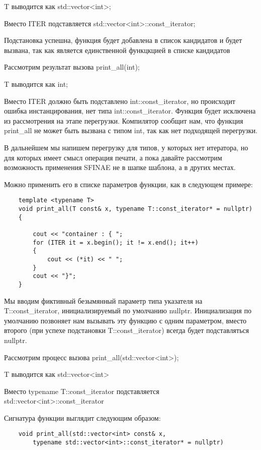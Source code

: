 	T выводится как std::vector<int>;
	
	Вместо ITER подставляется std::vector<int>::const\_iterator;
	
	Подстановка успешна, функция будет добавлена в список кандидатов и будет вызвана, так как является единственной функцкцией в списке кандидатов

	Рассмотрим результат вызова print\_all(int);
	
	T выводится как int;
	
	Вместо ITER должно быть подставлено int::const\_iterator, но происходит ошибка инстанцирования, нет типа int::const\_iterator. Функция будет исключена из рассмотрения на этапе перегрузки. Компилятор сообщит нам, что функция print\_all не может быть вызвана с типом int, так как нет подходящей перегрузки.

	В дальнейшем мы напишем перегрузку для типов, у которых нет итератора, но для которых имеет смысл операция печати, а пока давайте рассмотрим возможность применения SFINAE не в шапке шаблона, а в других местах.

	Можно применить его в списке параметров функции, как в следующем примере:
	
	\begin{verbatim}
	template <typename T>
	void print_all(T const& x, typename T::const_iterator* = nullptr)
	{

	    cout << "container : { ";
	    for (ITER it = x.begin(); it != x.end(); it++)
	    {
	        cout << (*it) << " ";
	    } 
	    cout << "}";
	}
	\end{verbatim}	
	
	Мы вводим фиктивный безымянный параметр типа указателя на T::const\_iterator, инициализируемый по умолчанию nullptr. Инициализация по умолчанию позвоняет нам вызывать эту функцию с одним параметром, вместо второго (при успехе подстановки T::const\_iterator) всегда будет подставляться nullptr.
		
	Рассмотрим процесс вызова print\_all(std::vector<int>);
		
	T выводится как std::vector<int>
		
	Вместо typename T::const\_iterator подставляется std::vector<int>::const\_iterator

	Сигнатура функции выглядит следующим образом:

	\begin{verbatim}
	void print_all(std::vector<int> const& x, 
	    typename std::vector<int>::const_iterator* = nullptr)
	\end{verbatim}	
	
